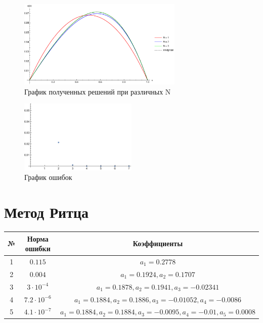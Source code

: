 \documentclass[12pt,a4paper]{article}
\begin{document}
    \begin{figure}[h]
        \centering
        \includegraphics[width=0.7\textwidth]{5.pdf}
        \caption{График полученных решений при различных N}
    \end{figure}
    \begin{figure}[h]
        \centering
        \includegraphics[width=0.5\textwidth]{5_error.pdf}
        \caption{График ошибок}
    \end{figure}

    \pagebreak

    \section{Метод Ритца}

    \begin{center}
        \begin{tabular}{|c|c|c|} 
         \hline
         № & Норма ошибки & Коэффициенты \\ 
         \hline
         1 & $0.115$ & $a_1=0.2778$ \\ 
         \hline
         2 & $0.004$ & $a_1=0.1924, a_2=0.1707$ \\ 
         \hline
         3 & $3\cdot10^{-4}$ & $a_1=0.1878, a_2=0.1941, a_3=-0.02341$ \\ 
         \hline
         4 & $7.2\cdot10^{-6}$ & $a_1=0.1884, a_2=0.1886, a_3=-0.01052, a_4=-0.0086$ \\ 
         \hline
         5 & $4.1\cdot10^{-7}$ & $a_1=0.1884, a_2=0.1884, a_3=-0.0095, a_4=-0.01, a_5=0.0008$ \\ 
         \hline
        \end{tabular}
    \end{center}
\end{document}
